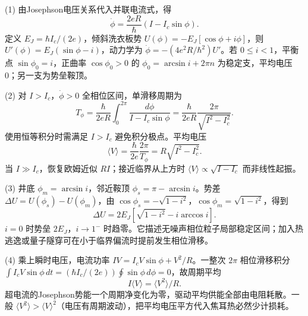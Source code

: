 (1) 由Josephson电压关系代入并联电流式，得
\[
\dot\phi=\frac{2eR}{\hbar}(I-I_c\sin\phi).
\]
定义 \(E_J=\hbar I_c/(2e)\)，倾斜洗衣板势 \(U(\phi)=-E_J[\cos\phi+i\phi]\)，则 \(U'(\phi)=E_J(\sin\phi-i)\)，动力学为 \(\dot\phi=-(4e^2R/\hbar^2)U'\)。若 \(0\le i<1\)，平衡点 \(\sin\phi_0=i\)，正曲率 \(\cos\phi_0>0\) 的 \(\phi_0=\arcsin i+2\pi n\) 为稳定支，平均电压0；另一支为势垒鞍顶。

(2) 对 \(I>I_c\)，\(\dot\phi>0\) 全相位区间，单滑移周期为
\[
T_\phi=\frac{\hbar}{2eR}\int_0^{2\pi}\frac{d\phi}{I-I_c\sin\phi}
=\frac{\hbar}{2eR}\frac{2\pi}{\sqrt{I^2-I_c^2}} .
\]
使用恒等积分时需满足 \(I>I_c\) 避免积分极点。平均电压
\[
\boxed{\langle V\rangle=\frac{\hbar}{2e}\frac{2\pi}{T_\phi}
=R\sqrt{I^2-I_c^2}}.
\]
当 \(I\gg I_c\)，恢复欧姆近似 \(RI\)；接近临界从上方时 \(\langle V\rangle\propto\sqrt{I-I_c}\) 而非线性起振。

(3) 井底 \(\phi_m=\arcsin i\)，邻近鞍顶 \(\phi_s=\pi-\arcsin i\)。势差
\(\Delta U=U(\phi_s)-U(\phi_m)\)，由 \(\cos\phi_s=-\sqrt{1-i^2}\)，\(\cos\phi_m=\sqrt{1-i^2}\)，得到
\[
\boxed{\Delta U=2E_J[\sqrt{1-i^2}-i\arccos i]}.
\]
\(i=0\) 时势垒 \(2E_J\)，\(i\to1^-\) 时趋零。它描述无噪声相位粒子局部稳定区间；加入热逃逸或量子隧穿可在小于临界偏流时提前发生相位滑移。

(4) 乘上瞬时电压，电流功率 \(IV=I_cV\sin\phi+V^2/R\)。一整次 \(2\pi\) 相位滑移积分
\(\int I_cV\sin\phi\,dt=(\hbar I_c/(2e))\oint\sin\phi\,d\phi=0\)，故周期平均
\[
\boxed{I\langle V\rangle=\langle V^2\rangle/R}.
\]
超电流的Josephson势能一个周期净变化为零，驱动平均供能全部由电阻耗散。一般 \(\langle V^2\rangle>\langle V\rangle^2\)（电压有周期波动），把平均电压平方代入焦耳热必然少计损耗。
